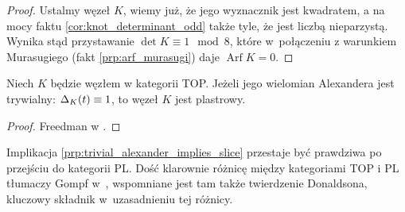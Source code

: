 \begin{proof}
    Ustalmy węzeł $K$, wiemy już, że jego wyznacznik jest kwadratem, a na mocy faktu \ref{cor:knot_determinant_odd} także tyle, że jest liczbą nieparzystą.
    Wynika stąd przystawanie $\det K \equiv 1 \mod 8$, które w~połączeniu z warunkiem Murasugiego (fakt \ref{prp:arf_murasugi}) daje $\operatorname{Arf} K = 0$.
\end{proof}

\begin{proposition}
    \label{prp:trivial_alexander_implies_slice}
    Niech $K$ będzie węzłem w kategorii TOP.
    Jeżeli jego wielomian Alexandera jest trywialny: $\Delta_K(t) \equiv 1$, to węzeł $K$ jest plastrowy.
\end{proposition}

\begin{proof}
    Freedman w \cite[tw. 1.13]{freedman82}.
\end{proof}

Implikacja \ref{prp:trivial_alexander_implies_slice} przestaje być prawdziwa po przejściu do kategorii PL.
Dość klarownie różnicę między kategoriami TOP i PL tłumaczy Gompf w~\cite{gompf86}, wspomniane jest tam także twierdzenie Donaldsona, kluczowy składnik w~uzasadnieniu tej różnicy.








